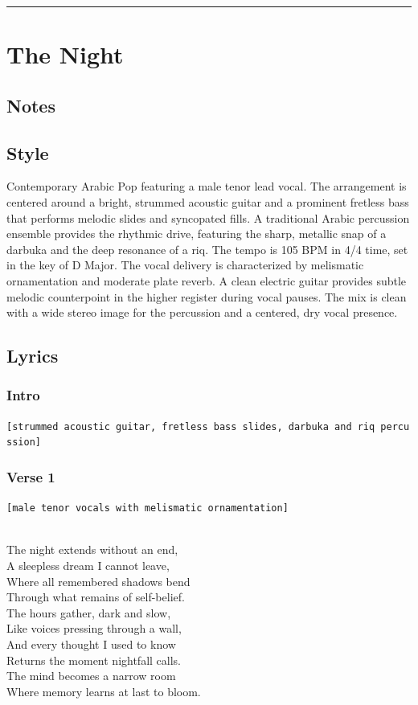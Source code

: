 \documentclass[]{article}
\begin{document}
\begin{center}\rule{0.5\linewidth}{0.5pt}\end{center}

\section{The Night}\label{the-night}

\subsection{Notes}\label{notes-42}

\subsection{Style}\label{style-42}

Contemporary Arabic Pop featuring a male tenor lead vocal. The
arrangement is centered around a bright, strummed acoustic guitar and a
prominent fretless bass that performs melodic slides and syncopated
fills. A traditional Arabic percussion ensemble provides the rhythmic
drive, featuring the sharp, metallic snap of a darbuka and the deep
resonance of a riq. The tempo is 105 BPM in 4/4 time, set in the key of
D Major. The vocal delivery is characterized by melismatic ornamentation
and moderate plate reverb. A clean electric guitar provides subtle
melodic counterpoint in the higher register during vocal pauses. The mix
is clean with a wide stereo image for the percussion and a centered, dry
vocal presence.

\subsection{Lyrics}\label{lyrics-42}

\subsubsection{Intro}\label{intro-15}

\texttt{{[}strummed\ acoustic\ guitar,\ fretless\ bass\ slides,\ darbuka\ and\ riq\ percussion{]}}

\subsubsection{Verse 1}\label{verse-1-25}

\texttt{{[}male\ tenor\ vocals\ with\ melismatic\ ornamentation{]}}\strut \\
The night extends without an end,\\
A sleepless dream I cannot leave,\\
Where all remembered shadows bend\\
Through what remains of self-belief.\\
The hours gather, dark and slow,\\
Like voices pressing through a wall,\\
And every thought I used to know\\
Returns the moment nightfall calls.\\
The mind becomes a narrow room\\
Where memory learns at last to bloom.
\end{document}
